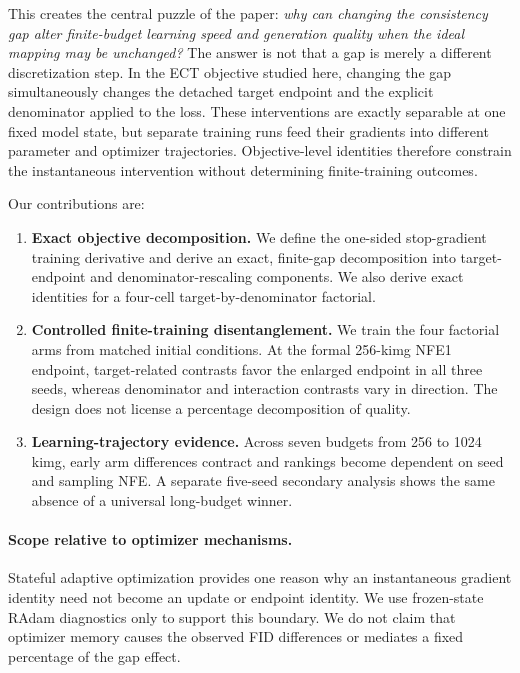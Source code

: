 \documentclass{article}
\begin{document}
This creates the central puzzle of the paper:
\emph{why can changing the consistency gap alter finite-budget learning speed
and generation quality when the ideal mapping may be unchanged?}
The answer is not that a gap is merely a different discretization step. In the
ECT objective studied here, changing the gap simultaneously changes the
detached target endpoint and the explicit denominator applied to the loss.
These interventions are exactly separable at one fixed model state, but
separate training runs feed their gradients into different parameter and
optimizer trajectories. Objective-level identities therefore constrain the
instantaneous intervention without determining finite-training outcomes.

Our contributions are:
\begin{enumerate}
  \item \textbf{Exact objective decomposition.}
  We define the one-sided stop-gradient training derivative and derive an exact,
  finite-gap decomposition into target-endpoint and denominator-rescaling
  components. We also derive exact identities for a four-cell
  target-by-denominator factorial.

  \item \textbf{Controlled finite-training disentanglement.}
  We train the four factorial arms from matched initial conditions. At the
  formal 256-kimg NFE1 endpoint, target-related contrasts favor the enlarged
  endpoint in all three seeds, whereas denominator and interaction contrasts
  vary in direction. The design does not license a percentage decomposition of
  quality.

  \item \textbf{Learning-trajectory evidence.}
  Across seven budgets from 256 to 1024 kimg, early arm differences contract
  and rankings become dependent on seed and sampling NFE. A separate five-seed
  secondary analysis shows the same absence of a universal long-budget winner.
\end{enumerate}

\paragraph{Scope relative to optimizer mechanisms.}
Stateful adaptive optimization provides one reason why an instantaneous
gradient identity need not become an update or endpoint identity. We use
frozen-state RAdam diagnostics only to support this boundary. We do not claim
that optimizer memory causes the observed FID differences or mediates a fixed
percentage of the gap effect.
\end{document}
